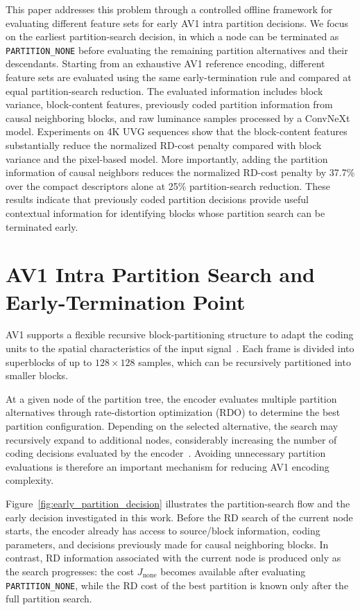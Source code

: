 \documentclass{article}
\begin{document}
This paper addresses this problem through a controlled offline framework for evaluating different feature sets for early AV1 intra partition decisions. We focus on the earliest partition-search decision, in which a node can be terminated as \texttt{PARTITION\_NONE} before evaluating the remaining partition alternatives and their descendants. Starting from an exhaustive AV1 reference encoding, different feature sets are evaluated using the same early-termination rule and compared at equal partition-search reduction. The evaluated information includes block variance, block-content features, previously coded partition information from causal neighboring blocks, and raw luminance samples processed by a ConvNeXt model. Experiments on 4K UVG sequences show that the block-content features substantially reduce the normalized RD-cost penalty compared with block variance and the pixel-based model. More importantly, adding the partition information of causal neighbors reduces the normalized RD-cost penalty by 37.7\% over the compact descriptors alone at 25\% partition-search reduction. These results indicate that previously coded partition decisions provide useful contextual information for identifying blocks whose partition search can be terminated early.

\section{AV1 Intra Partition Search and Early-Termination Point}
\label{sec:partition}

AV1 supports a flexible recursive block-partitioning structure to adapt the coding units to the spatial characteristics of the input signal~\cite{han2021av1overview,chen2018av1tools}. Each frame is divided into superblocks of up to $128\times128$ samples, which can be recursively partitioned into smaller blocks.

At a given node of the partition tree, the encoder evaluates multiple partition alternatives through rate-distortion optimization (RDO) to determine the best partition configuration. Depending on the selected alternative, the search may recursively expand to additional nodes, considerably increasing the number of coding decisions evaluated by the encoder~\cite{bender2023av1complexity}. Avoiding unnecessary partition evaluations is therefore an important mechanism for reducing AV1 encoding complexity.

Figure~\ref{fig:early_partition_decision} illustrates the partition-search flow and the early decision investigated in this work. Before the RD search of the current node starts, the encoder already has access to source/block information, coding parameters, and decisions previously made for causal neighboring blocks. In contrast, RD information associated with the current node is produced only as the search progresses: the cost $J_{\mathrm{none}}$ becomes available after evaluating \texttt{PARTITION\_NONE}, while the RD cost of the best partition is known only after the full partition search.
\end{document}
